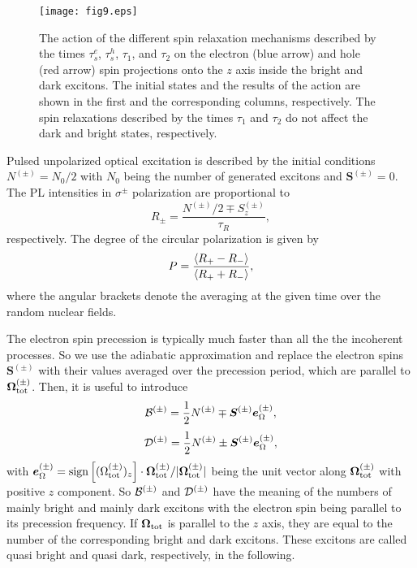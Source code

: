 \documentclass[twocolumn,showpacs,preprintnumbers,amsmath,amssymb,aps]{revtex4-1}
\begin{document}
\begin{figure}[t]
\centering
\texttt{[image: fig9.eps]}
\caption{The action of the different spin relaxation mechanisms
described by the times $\tau_s^e$, $\tau_s^h$, $\tau_1$, and
$\tau_2$ on the electron (blue arrow) and hole (red arrow) spin
projections onto the $z$ axis inside the bright and dark excitons.
The initial states and the results of the action are shown in the
first and the corresponding columns, respectively. The spin
relaxations described by the times $\tau_1$ and $\tau_2$ do not
affect the dark and bright states, respectively.} \label{fig9}
\end{figure}

Pulsed unpolarized optical excitation is described by the initial
conditions $N^{(\pm)}=N_0/2$ with $N_0$ being the number of generated
excitons and $\bm S^{(\pm)}=0$. The PL intensities in
$\sigma^\pm$ polarization are proportional to
\begin{equation}
R_\pm = \frac{N^{(\pm)}/2\mp S_z^{(\pm)}}{\tau_R},
\end{equation}
respectively. The degree of the circular polarization is given by
\begin{equation}
P = \frac{\braket{R_+ - R_-}}{\braket{R_+ + R_-}},
\end{equation}
where the angular brackets denote the averaging at the given time
over the random nuclear fields.

The electron spin precession is typically much faster than all the
the incoherent processes. So we use the adiabatic approximation and
replace the electron spins $\bm S^{(\pm)}$ with their values
averaged over the precession period, which are parallel to
$\bm\Omega_{\rm tot}^{(\pm)}$. Then, it is useful to introduce
\begin{equation}
{\cal B}^{(\pm)} = \frac{1}{2} N^{(\pm)} \mp {\bm S}^{(\pm)} {\bm e}_\Omega^{(\pm)},
\end{equation}
\begin{equation}
{\cal D}^{(\pm)} = \frac{1}{2} N^{(\pm)} \pm {\bm S}^{(\pm)} {\bm e}_\Omega^{(\pm)},
\end{equation}
with ${\bm e}_\Omega^{(\pm)} = {\rm sign}\left[(\Omega_{\rm
tot}^{(\pm)})_z\right]\cdot {\bm \Omega}_{\rm tot}^{(\pm)}/|{\bm
\Omega}_{\rm tot}^{(\pm)}|$ being the unit
vector along $\bm\Omega_{\rm tot}^{(\pm)}$ with positive $z$
component. So ${\cal B}^{(\pm)}$ and ${\cal D}^{(\pm)}$ have the
meaning of the numbers of mainly bright and mainly dark excitons with
the electron spin being parallel to its precession frequency. If ${\bm
\Omega}_{\rm tot}$ is parallel to the $z$ axis, they are equal to the
number of the corresponding bright and dark excitons. These
excitons are called quasi bright and quasi dark, respectively, in the
following.
\end{document}
